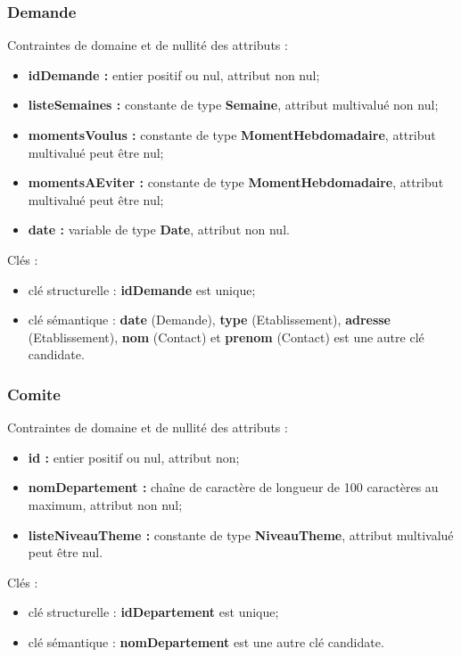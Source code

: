 \subsubsection*{Demande}
Contraintes de domaine et de nullité des attributs :
\begin{itemize}
	\item \textbf{idDemande :} entier positif ou nul, attribut non nul;
 	\item \textbf{listeSemaines :} constante de type \textbf{Semaine}, attribut multivalué non nul; 
	\item \textbf{momentsVoulus :} constante de type \textbf{MomentHebdomadaire}, attribut multivalué peut être nul;
	\item \textbf{momentsAEviter :} constante de type \textbf{MomentHebdomadaire}, attribut multivalué peut être nul;
	\item \textbf{date :} variable de type \textbf{Date}, attribut non nul.\\
\end{itemize} 

Clés : 
\begin{itemize}
\item clé structurelle : \textbf{idDemande} est unique;
\item clé sémantique : \textbf{date} (Demande), \textbf{type} (Etablissement), \textbf{adresse} (Etablissement), \textbf{nom} (Contact) et \textbf{prenom} (Contact) est une autre clé candidate. \\ 
\end{itemize}

\subsubsection*{Comite}
Contraintes de domaine et de nullité des attributs :
\begin{itemize}
	\item \textbf{id :} entier positif ou nul, attribut non;
	\item \textbf{nomDepartement :} chaîne de caractère de longueur de 100 caractères au maximum, attribut non nul;
	\item \textbf{listeNiveauTheme :} constante de type \textbf{NiveauTheme}, attribut multivalué peut être nul. \\
\end{itemize}

Clés : 
\begin{itemize}
\item clé structurelle : \textbf{idDepartement} est unique;
\item clé sémantique : \textbf{nomDepartement} est une autre clé candidate. \\ 
\end{itemize}

